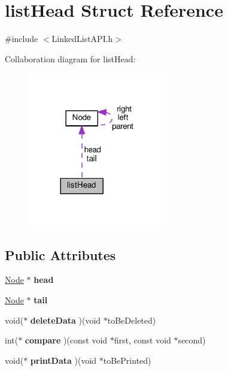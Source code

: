 \hypertarget{structlistHead}{}\section{list\+Head Struct Reference}
\label{structlistHead}


{\ttfamily \#include $<$Linked\+List\+A\+P\+I.\+h$>$}



Collaboration diagram for list\+Head\+:
\nopagebreak
\begin{figure}[H]
\begin{center}
\leavevmode
\includegraphics[width=173pt]{structlistHead__coll__graph}
\end{center}
\end{figure}
\subsection*{Public Attributes}
\begin{DoxyCompactItemize}
\item 
\mbox{\label{structlistHead_a824ef0b95a848fde5f0dc503480edb61}} 
\hyperlink{structNode}{Node} $\ast$ {\bfseries head}
\item 
\mbox{\label{structlistHead_aafa27aceb900bf0e4ebf07857a0a94f3}} 
\hyperlink{structNode}{Node} $\ast$ {\bfseries tail}
\item 
\mbox{\label{structlistHead_ae6fd9f56c9b85bd823c1c2e104c6ccaf}} 
void($\ast$ {\bfseries delete\+Data} )(void $\ast$to\+Be\+Deleted)
\item 
\mbox{\label{structlistHead_a0b7a3598d7dc73526fddff45a3e29595}} 
int($\ast$ {\bfseries compare} )(const void $\ast$first, const void $\ast$second)
\item 
\mbox{\label{structlistHead_a8247a7a84929fe9e4bdac0fb8dbf4633}} 
void($\ast$ {\bfseries print\+Data} )(void $\ast$to\+Be\+Printed)
\end{DoxyCompactItemize}


